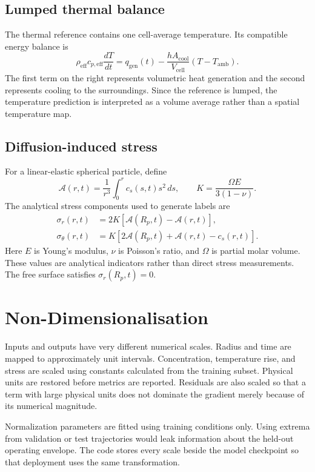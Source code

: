 \documentclass[14pt,a4paper,oneside]{extreport}
\begin{document}
\subsection{Lumped thermal balance}
The thermal reference contains one cell-average temperature. Its compatible energy balance is
\begin{equation}
\rho_{\mathrm{eff}}c_{p,\mathrm{eff}}\frac{dT}{dt}
=q_{\mathrm{gen}}(t)-\frac{hA_{\mathrm{cool}}}{V_{\mathrm{cell}}}(T-T_{\mathrm{amb}}).
\label{eq:thermal_report}
\end{equation}
The first term on the right represents volumetric heat generation and the second represents cooling to the surroundings. Since the reference is lumped, the temperature prediction is interpreted as a volume average rather than a spatial temperature map.

\subsection{Diffusion-induced stress}
For a linear-elastic spherical particle, define
\begin{equation}
\mathcal{A}(r,t)=\frac{1}{r^3}\int_0^r c_s(s,t)s^2\,ds,
\qquad K=\frac{\Omega E}{3(1-\nu)}.
\end{equation}
The analytical stress components used to generate labels are
\begin{align}
\sigma_r(r,t)&=2K\left[\mathcal{A}(R_p,t)-\mathcal{A}(r,t)\right],\\
\sigma_{\theta}(r,t)&=K\left[2\mathcal{A}(R_p,t)+\mathcal{A}(r,t)-c_s(r,t)\right].
\end{align}
Here $E$ is Young's modulus, $\nu$ is Poisson's ratio, and $\Omega$ is partial molar volume. These values are analytical indicators rather than direct stress measurements. The free surface satisfies $\sigma_r(R_p,t)=0$.

\section{Non-Dimensionalisation}
Inputs and outputs have very different numerical scales. Radius and time are mapped to approximately unit intervals. Concentration, temperature rise, and stress are scaled using constants calculated from the training subset. Physical units are restored before metrics are reported. Residuals are also scaled so that a term with large physical units does not dominate the gradient merely because of its numerical magnitude.

Normalization parameters are fitted using training conditions only. Using extrema from validation or test trajectories would leak information about the held-out operating envelope. The code stores every scale beside the model checkpoint so that deployment uses the same transformation.
\end{document}
